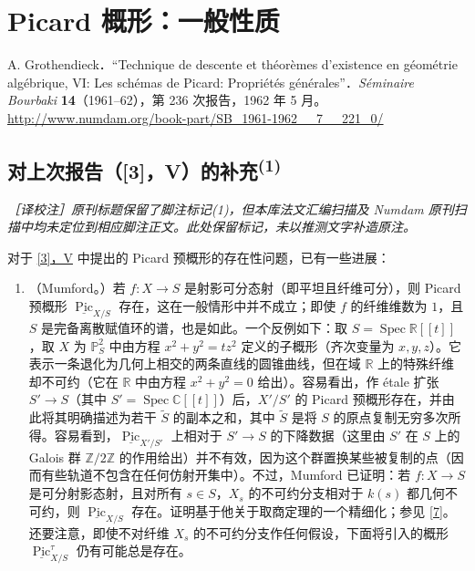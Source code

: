 
\clearpage
\setcounter{chapter}{-1}
\renewcommand\fgaAnchorPrefix{fga3.vi}

\part{Picard 概形：一般性质}\label{fga3.vi}\thispagestyle{fancy}\begin{original}{}\label{fga3.vi-original-citation}\skipsinglepar\par{}A. Grothendieck．“Technique de descente et théorèmes d'existence en géométrie algébrique, VI: Les schémas de Picard: Propriétés générales”．\emph{Séminaire Bourbaki} \textbf{14}（1961–62），第 236 次报告，1962 年 5 月。\url{http://www.numdam.org/book-part/SB_1961-1962__7__221_0/}\end{original}\setcounter{chapter}{-1}\chapter[{对上次报告（[3]，V）的补充}]{对上次报告（[3]，V）的补充\textsuperscript{(1)}}\thispagestyle{fancy}\label{fga3.vi-0}\par{}\emph{［译校注］原刊标题保留了脚注标记(1)，但本库法文汇编扫描及 Numdam 原刊扫描中均未定位到相应脚注正文。此处保留标记，未以推测文字补造原注。}\par{}对于 \hyperref[fga3.v]{[3]，V} 中提出的 Picard 预概形的存在性问题，已有一些进展：\begin{enumerate}
    
 \item[a.]（Mumford。）若 \(f\colon  X\to  S\) 是射影可分态射（即平坦且纤维可分），则 Picard 预概形 \(\underline {\operatorname {Pic}}_{X/S}\) 存在，这在一般情形中并不成立；即使 \(f\) 的纤维维数为 \(1\)，且 \(S\) 是完备离散赋值环的谱，也是如此。一个反例如下：取 \(S=\operatorname {Spec}\mathbb {R}[{[t]}]\)，取 \(X\) 为 \(\mathbb {P}_S^2\) 中由方程 \(x^2+y^2=tz^2\) 定义的子概形（齐次变量为 \(x,y,z\)）。它表示一条退化为几何上相交的两条直线的圆锥曲线，但在域 \(\mathbb {R}\) 上的特殊纤维却不可约（它在 \(\mathbb {R}\) 中由方程 \(x^2+y^2=0\) 给出）。容易看出，作 étale 扩张 \(S'\to  S\)（其中 \(S'=\operatorname {Spec}\mathbb {C}[{[t]}]\)）后，\(X'/S'\) 的 Picard 预概形存在，并由此将其明确描述为若干 \(\widetilde {S}\) 的副本之和，其中 \(\widetilde {S}\) 是将 \(S\) 的原点复制无穷多次所得。容易看到，\(\underline {\operatorname {Pic}}_{X'/S'}\) 上相对于 \(S'\to  S\) 的下降数据（这里由 \(S'\) 在 \(S\) 上的 Galois 群 \(\mathbb {Z}/2\mathbb {Z}\) 的作用给出）并不有效，因为这个群置换某些被复制的点（因而有些轨道不包含在任何仿射开集中）。不过，Mumford 已证明：若 \(f\colon  X\to  S\) 是可分射影态射，且对所有 \(s\in  S\)，\(X_s\) 的不可约分支相对于 \(k(s)\) 都几何不可约，则 \(\underline {\operatorname {Pic}}_{X/S}\) 存在。证明基于他关于取商定理的一个精细化；参见 \hyperref[fga3.vi-bib-7]{[7]}。还要注意，即使不对纤维 \(X_s\) 的不可约分支作任何假设，下面将引入的概形 \(\underline {\operatorname {Pic}}_{X/S}^\tau \) 仍有可能总是存在。



\end{enumerate}
